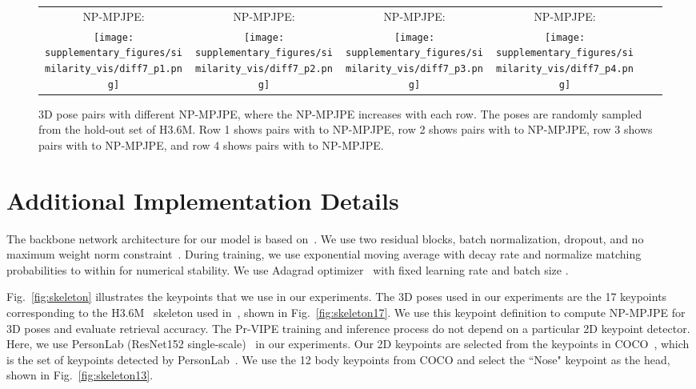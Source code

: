 \begin{figure*}[!t]
\begin{tabular}{cccccc}
\scriptsize{NP-MPJPE: } & \scriptsize{NP-MPJPE: }\hspace{\fighspace} & \scriptsize{NP-MPJPE: } & \scriptsize{NP-MPJPE: }\hspace{\fighspace} \\

\texttt{[image: supplementary\_figures/similarity\_vis/diff7\_p1.png]}\hspace{\fighspace} & \texttt{[image: supplementary\_figures/similarity\_vis/diff7\_p2.png]}\hspace{\fighspacer} & \texttt{[image: supplementary\_figures/similarity\_vis/diff7\_p3.png]}\hspace{\fighspace} & \texttt{[image: supplementary\_figures/similarity\_vis/diff7\_p4.png]}\hspace{\fighspacer} \\



\end{tabular}
\caption{3D pose pairs with different NP-MPJPE, where the NP-MPJPE increases with each row. The poses are randomly sampled from the hold-out set of H3.6M. Row 1 shows pairs with  to  NP-MPJPE, row 2 shows pairs with  to  NP-MPJPE, row 3 shows pairs with  to  NP-MPJPE, and row 4 shows pairs with  to  NP-MPJPE.}
\label{fig:supp_similarity}
\vspace{-0.2cm}
\end{figure*}
 
\section{Additional Implementation Details}\label{sec:implementation_details}

The backbone network architecture for our model is based on~\cite{martinez2017simple}. We use two residual blocks, batch normalization,  dropout, and no maximum weight norm constraint~\cite{martinez2017simple}. During training, we use exponential moving average with  decay rate and normalize matching probabilities to within  for numerical stability. We use Adagrad optimizer~\cite{duchi2011adaptive} with fixed learning rate  and batch size .

 Fig.~\ref{fig:skeleton} illustrates the keypoints that we use in our experiments. The 3D poses used in our experiments are the 17 keypoints corresponding to the H3.6M~\cite{ionescu2013human3} skeleton used in~\cite{martinez2017simple}, shown in Fig.~\ref{fig:skeleton17}. We use this keypoint definition to compute NP-MPJPE for 3D poses and evaluate retrieval accuracy. The Pr-VIPE training and inference process do not depend on a particular 2D keypoint detector. Here, we use PersonLab (ResNet152 single-scale)~\cite{papandreou2018personlab} in our experiments. Our 2D keypoints are selected from the keypoints in COCO~\cite{lin2014microsoft}, which is the set of keypoints detected by PersonLab~\cite{papandreou2018personlab}. We use the 12 body keypoints from COCO and select the ``Nose" keypoint as the head, shown in Fig.~\ref{fig:skeleton13}.

